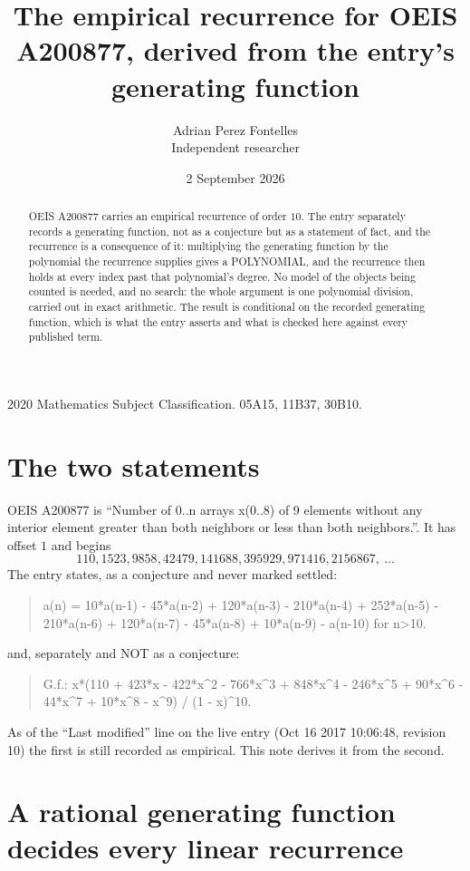 \documentclass[11pt,a4paper]{article}
\title{The empirical recurrence for OEIS A200877, derived from the entry's generating function}
\author{Adrian Perez Fontelles\\ \small Independent researcher}
\date{2 September 2026}
\theoremstyle{plain}
\theoremstyle{definition}
\begin{document}
\maketitle

\begin{abstract}
OEIS A200877 carries an empirical recurrence of order $10$. The entry separately records a
generating function, not as a conjecture but as a statement of fact, and the recurrence is a
consequence of it: multiplying the generating function by the polynomial the recurrence
supplies gives a POLYNOMIAL, and the recurrence then holds at every index past that
polynomial's degree. No model of the objects being counted is needed, and no search: the
whole argument is one polynomial division, carried out in exact arithmetic. The result is
conditional on the recorded generating function, which is what the entry asserts and what is
checked here against every published term.
\end{abstract}

\noindent\small 2020 Mathematics Subject Classification. 05A15, 11B37, 30B10.\normalsize

\section{The two statements}

OEIS A200877 is ``Number of 0..n arrays x(0..8) of 9 elements without any interior element greater than both neighbors or less than both neighbors.''. It has offset $1$ and begins
\[
110, 1523, 9858, 42479, 141688, 395929, 971416, 2156867,\ \dots
\]
The entry states, as a conjecture and never marked settled:
\begin{quote}
a(n) = 10*a(n-1) - 45*a(n-2) + 120*a(n-3) - 210*a(n-4) + 252*a(n-5) - 210*a(n-6) + 120*a(n-7) - 45*a(n-8) + 10*a(n-9) - a(n-10) for n>10.
\end{quote}
and, separately and NOT as a conjecture:
\begin{quote}
G.f.: x*(110 + 423*x - 422*x\^{}2 - 766*x\^{}3 + 848*x\^{}4 - 246*x\^{}5 + 90*x\^{}6 - 44*x\^{}7 + 10*x\^{}8 - x\^{}9) / (1 - x)\^{}10.
\end{quote}
As of the ``Last modified'' line on the live entry (Oct 16 2017 10:06:48, revision 10) the first is still
recorded as empirical. This note derives it from the second.

\section{A rational generating function decides every linear recurrence}
\end{document}

